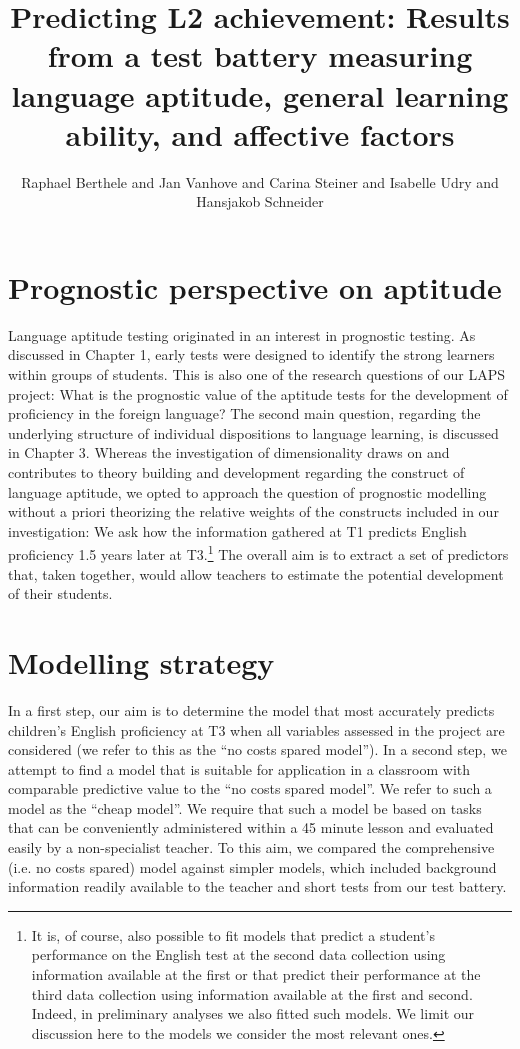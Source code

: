 \documentclass[output=paper]{langsci/langscibook}
\author{Raphael Berthele\orcid{}\affiliation{University of Fribourg, Institut de Plurilinguisme} and Jan Vanhove\orcid{}\affiliation{University of Fribourg, Institut de Plurilinguisme} and Carina Steiner\orcid{}\affiliation{University of Berne, Center for the Study of Language and Society} and Isabelle Udry\orcid{}\affiliation{University of Fribourg, Institut de Plurilinguisme; Zurich University of Teacher Education} and Hansjakob Schneider\orcid{}\affiliation{Zurich University of Teacher Education}}
\title[Predicting L2 achievement]
      {Predicting L2 achievement: Results from a test battery measuring language aptitude, general learning ability, and affective factors}
\begin{document}
\renewcommand{\lsChapterFooterSize}{\footnotesize}
\maketitle \label{ch:4}

\section{Prognostic perspective on aptitude}

Language aptitude testing originated in an interest in prognostic testing. As discussed in Chapter 1, early tests were designed to identify the strong learners within groups of students. This is also one of the research questions of our LAPS project: What is the prognostic value of the aptitude tests for the development of proficiency in the foreign language? The second main question, regarding the underlying structure of individual dispositions to language learning, is discussed in Chapter 3.  Whereas the investigation of dimensionality draws on and contributes to theory building and development regarding the construct of language aptitude, we opted to approach the question of prognostic modelling without a priori theorizing the relative weights of the constructs included in our investigation: We ask how the information gathered at T1 predicts English proficiency 1.5 years later at T3.\footnote{It is, of course, also possible to fit models that predict a student’s performance on the English test at the second data collection using information available at the first or that predict their performance at the third data collection using information available at the first and second. Indeed, in preliminary analyses we also fitted such models. We limit our discussion here to the models we consider the most relevant ones.} The overall aim is to extract a set of predictors that, taken together, would allow teachers to estimate the potential development of their students.

\section{Modelling strategy}

In a first step, our aim is to determine the model that most accurately predicts children’s English proficiency at T3 when all variables assessed in the project are considered (we refer to this as the ``no costs spared model''). In a second step, we attempt to find a model that is suitable for application in a classroom with comparable predictive value to the ``no costs spared model''. We refer to such a model as the ``cheap model''. We require that such a model be based on tasks that can be conveniently administered within a 45 minute lesson and evaluated easily by a non-specialist teacher. To this aim, we compared the comprehensive (i.e. no costs spared) model against simpler models, which included background information readily available to the teacher and short tests from our test battery.
\end{document}
